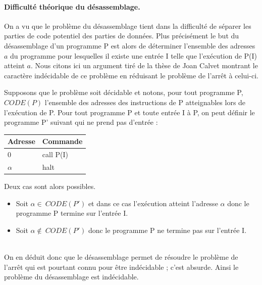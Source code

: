 \paragraph{Difficulté théorique du désassemblage.}
On a vu que le problème du désassemblage tient dans la difficulté de séparer les parties de code potentiel des parties de données.
Plus précisément le but du désassemblage d'un programme P est alors de déterminer l'ensemble des adresses $a$ du programme pour lesquelles il existe une entrée I telle que l'exécution de P(I) atteint $a$.
Nous citons ici un argument tiré de la thèse de Joan Calvet \cite{Calvet2013} montrant le caractère indécidable de ce problème en réduisant le problème de l'arrêt à celui-ci.

Supposons que le problème soit décidable et notons, pour tout programme P, $CODE(P)$ l'ensemble des adresses des instructions de P atteignables lors de l'exécution de P. Pour tout programme P et toute entrée I à P, on peut définir le programme P' suivant qui ne prend pas d'entrée :

\begin{center}
\begin{tabular}{|l|l|}
\hline
Adresse & Commande \\
\hline
0 & call P(I)\\
$\alpha$ & halt \\
\hline
\end{tabular}
\end{center}

Deux cas sont alors possibles.
\begin{itemize}
 \item Soit $\alpha\in\ CODE(P')$ et dans ce cas l'exécution atteint l'adresse $\alpha$ donc le programme P termine sur l'entrée I.
 \item Soit $\alpha\notin\ CODE(P')$ donc le programme P ne termine pas sur l'entrée I.
\end{itemize}
~\\
On en déduit donc que le désassemblage permet de résoudre le problème de l'arrêt qui est pourtant connu pour être indécidable ; c'est absurde.
Ainsi le problème du désassemblage est indécidable.


